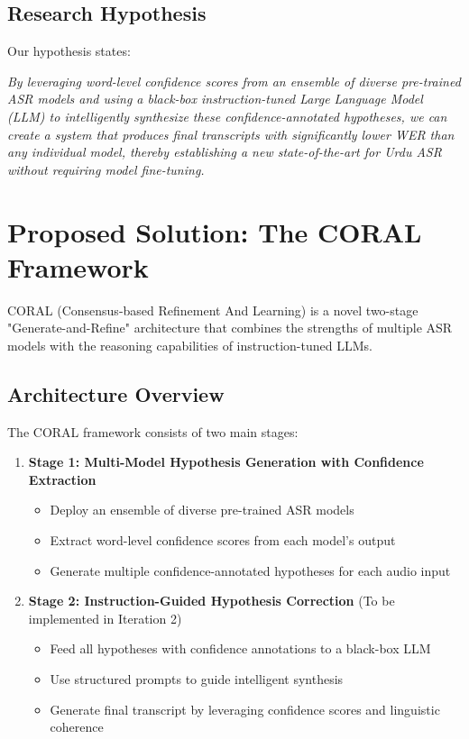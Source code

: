 \subsection{Research Hypothesis}

Our hypothesis states:

\textit{By leveraging word-level confidence scores from an ensemble of diverse pre-trained ASR models and using a black-box instruction-tuned Large Language Model (LLM) to intelligently synthesize these confidence-annotated hypotheses, we can create a system that produces final transcripts with significantly lower WER than any individual model, thereby establishing a new state-of-the-art for Urdu ASR without requiring model fine-tuning.}

\section{Proposed Solution: The CORAL Framework}

CORAL (Consensus-based Refinement And Learning) is a novel two-stage "Generate-and-Refine" architecture that combines the strengths of multiple ASR models with the reasoning capabilities of instruction-tuned LLMs.

\subsection{Architecture Overview}

The CORAL framework consists of two main stages:

\begin{enumerate}
    \item \textbf{Stage 1: Multi-Model Hypothesis Generation with Confidence Extraction}
    \begin{itemize}
        \item Deploy an ensemble of diverse pre-trained ASR models
        \item Extract word-level confidence scores from each model's output
        \item Generate multiple confidence-annotated hypotheses for each audio input
    \end{itemize}
    
    \item \textbf{Stage 2: Instruction-Guided Hypothesis Correction} (To be implemented in Iteration 2)
    \begin{itemize}
        \item Feed all hypotheses with confidence annotations to a black-box LLM
        \item Use structured prompts to guide intelligent synthesis
        \item Generate final transcript by leveraging confidence scores and linguistic coherence
    \end{itemize}
\end{enumerate}

